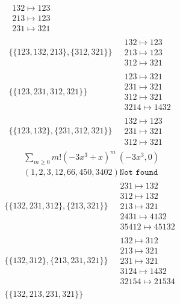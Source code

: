 \begin{scriptsize}
\begin{align}
\begin{matrix}
132 \mapsto 123
\\
213 \mapsto 123
\\
231 \mapsto 321
\end{matrix}
\\
\{\{123, 132, 213\}, \{312, 321\}\}
\ 
&
\begin{matrix}
132 \mapsto 123
\\
213 \mapsto 123
\\
312 \mapsto 321
\end{matrix}
\\
\{\{123, 231, 312, 321\}\}
\ 
&
\begin{matrix}
123 \mapsto 321
\\
231 \mapsto 321
\\
312 \mapsto 321
\\
3214 \mapsto 1432
\end{matrix}
\\
\{\{123, 132\}, \{231, 312, 321\}\}
\ 
&
\begin{matrix}
132 \mapsto 123
\\
231 \mapsto 321
\\
312 \mapsto 321
\end{matrix}
\end{align}
$$
\begin{matrix}
\sum_{m \geq 0} m! \left(
-3 x^{3} + x
\right)^m
\ 
\left(-3 x^{3}, 0\right)
\\
\left(1, 2, 3, 12, 66, 450, 3402\right)
\texttt{Not found}
\end{matrix}
$$
\begin{align}
\{\{132, 231, 312\}, \{213, 321\}\}
\ 
&
\begin{matrix}
231 \mapsto 132
\\
312 \mapsto 132
\\
213 \mapsto 321
\\
2431 \mapsto 4132
\\
35412 \mapsto 45132
\end{matrix}
\\
\{\{132, 312\}, \{213, 231, 321\}\}
\ 
&
\begin{matrix}
132 \mapsto 312
\\
213 \mapsto 321
\\
231 \mapsto 321
\\
3124 \mapsto 1432
\\
32154 \mapsto 21534
\end{matrix}
\\
\{\{132, 213, 231, 321\}\}
\ 
&
\begin{matrix}

\end{matrix}
\end{align}
\end{scriptsize}

